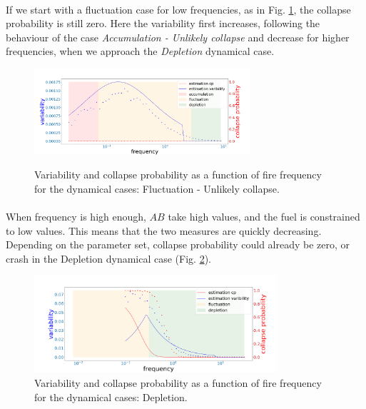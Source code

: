 \documentclass{article}
\begin{document}
\paragraph{}
If we start with a fluctuation case for low frequencies, as in Fig. \ref{fig:vcp2}, the collapse probability is still zero. Here the variability first increases, following the behaviour of the case \textit{Accumulation - Unlikely collapse} and decrease for higher frequencies, when we approach the \textit{Depletion} dynamical case.

\begin{figure}[h!]
\begin{center}
\includegraphics[width=8cm]{results/measures_fluctu_unlikely.png} \\
\end{center}
\caption{\label{fig:vcp2}Variability and collapse probability as a function of fire frequency for the dynamical cases: Fluctuation - Unlikely collapse.}
\end{figure}

\paragraph{}
When frequency is high enough, $AB$ take high values, and the fuel is constrained to low values. This means that the two measures are quickly decreasing. Depending on the parameter set, collapse probability could already be zero, or crash in the Depletion dynamical case (Fig. \ref{fig:vcp3}).

\begin{figure}[h!]
\begin{center}
\includegraphics[width=9cm]{results/measures_depletion.png}
\end{center}
\caption{\label{fig:vcp3}Variability and collapse probability as a function of fire frequency for the dynamical cases: Depletion.}
\end{figure}
\end{document}
